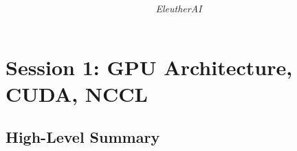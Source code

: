 \documentclass[11pt]{article}
\title{\blue{ML Performance Reading Group Notes} \\ \large }
\author{\textit{EleutherAI}}
\date{}
\begin{document}
\maketitle

\section{ \textbf{Session 1: GPU Architecture, CUDA, NCCL}}


\subsection{High-Level Summary}
\end{document}
